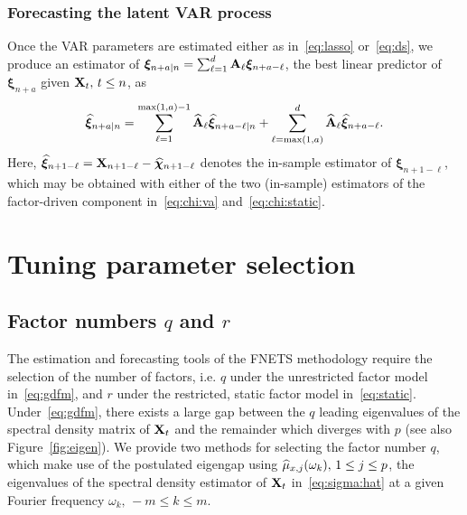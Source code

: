 \subsubsection{Forecasting the latent VAR process}
\label{sec:idio:pred}

Once the VAR parameters are estimated either as in~\eqref{eq:lasso} or~\eqref{eq:ds}, we produce an estimator of $\bm\xi_{n + a \vert n} = \sum_{\ell = 1}^{d} \mathbf A_{\ell} \bm\xi_{n + a - \ell}$, the best linear predictor of $\bm\xi_{n + a}$ given $\mathbf X_t, \, t \le n$, as
\begin{align}
\label{eq:idio:best:lin:pred}
\widehat{\bm\xi}_{n + a \vert n} = \sum_{\ell = 1}^{\max(1, a) - 1} \widehat{\mathbf A}_{\ell} \widehat{\bm\xi}_{n + a - \ell \vert n} + \sum_{\ell = \max(1, a)}^{d} \widehat{\mathbf A}_{\ell} \widehat{\bm\xi}_{n + a - \ell}.
\end{align}
Here, $\widehat{\bm\xi}_{n + 1 - \ell} = \mathbf X_{n + 1 - \ell} - \widehat{\bm\chi}_{n + 1 - \ell}$ denotes the in-sample estimator of $\bm\xi_{n + 1 - \ell}$, which may be obtained with either of the two (in-sample) estimators of the factor-driven component in~\eqref{eq:chi:va} and~\eqref{eq:chi:static}.

\section{Tuning parameter selection}
\label{sec:tuning}

\subsection{Factor numbers $q$ and $r$}
\label{sec:tuning:factor}

The estimation and forecasting tools of the FNETS methodology require the selection of the number of factors, i.e. $q$ under the unrestricted factor model in~\eqref{eq:gdfm}, and $r$ under the restricted, static factor model in~\eqref{eq:static}.
Under~\eqref{eq:gdfm}, there exists a large gap between the $q$ leading eigenvalues of the spectral density matrix of $\mathbf X_t$ and the remainder which diverges with $p$ (see also Figure~\ref{fig:eigen}).
We provide two methods for selecting the factor number $q$, which make use of the postulated eigengap using $\widehat\mu_{x, j}(\omega_k), \, 1 \le j \le p$, the eigenvalues of the spectral density estimator of $\mathbf X_t$ in~\eqref{eq:sigma:hat} at a given Fourier frequency $\omega_k, \, -m \le k \le m$.

